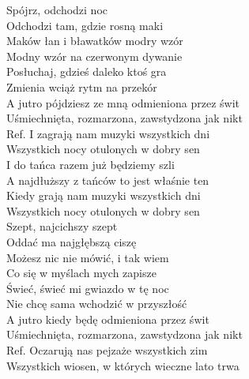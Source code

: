 
\begin{flushleft}
Spójrz, odchodzi noc  \tab{} \tab{}  \\
Odchodzi tam, gdzie rosną maki  \tab{}   \\
Maków łan i bławatków modry wzór  \tab{}  \\
Modny wzór na czerwonym dywanie  \tab{}  \\
Posłuchaj, gdzieś daleko ktoś gra  \tab{}  \\
Zmienia wciąż rytm na przekór  \tab{}  \\
A jutro pójdziesz ze mną odmieniona przez świt    \\
Uśmiechnięta, rozmarzona, zawstydzona jak nikt   \\
\vskip 3mm
Ref. I zagrają nam muzyki wszystkich dni  \tab{}   \\
\hspace{0.9cm}Wszystkich nocy otulonych w dobry sen  \tab{}   \\
\hspace{0.9cm}I do tańca razem już będziemy szli  \tab{}  \\
\hspace{0.9cm}A najdłuższy z tańców to jest właśnie ten   \\
\hspace{0.9cm}Kiedy grają nam muzyki wszystkich dni  \tab{}  \\
\hspace{0.9cm}Wszystkich nocy otulonych w dobry sen  \tab{} \\
\vskip 3mm
Szept, najcichszy szept \\
Oddać ma najgłębszą ciszę \\
Możesz nic nie mówić, i tak wiem \\
Co się w myślach mych zapisze \\
Świeć, świeć mi gwiazdo w tę noc \\
Nie chcę sama wchodzić w przyszłość \\
A jutro kiedy będę odmieniona przez świt \\
Uśmiechnięta, rozmarzona, zawstydzona jak nikt \\
\vskip 3mm
Ref. Oczarują nas pejzaże wszystkich zim \\
\hspace{0.9cm}Wszystkich wiosen, w których wieczne lato trwa \\

\end{flushleft}

